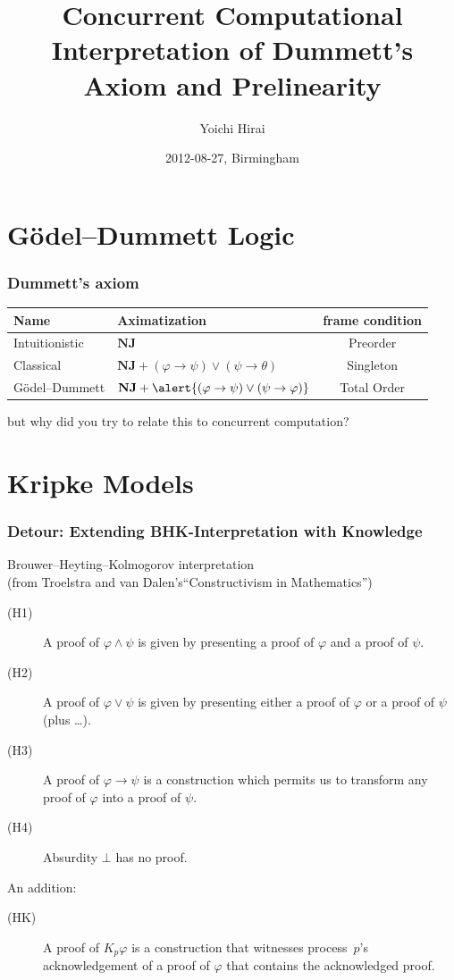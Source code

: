 \documentclass[slidestop,compress,mathserif]{beamer}
\title{Concurrent Computational Interpretation of Dummett's Axiom and Prelinearity}
\author{Yoichi Hirai}
\institute{Univ. of Tokyo, JSPS research fellow, \\
visiting Univ. of Amsterdam (until today)}
\date{2012-08-27, Birmingham}
\renewcommand{\phi}{\varphi}
\begin{document}
 \begin{frame} %
  \titlepage
 \end{frame}


\newcommand{\NJ}{\mathbf{NJ}}

 \section{G\"odel--Dummett Logic}
  \begin{frame}
   \frametitle{Dummett's axiom}
   \begin{tabular}{|l|l|c|}
    \hline
    Name & Aximatization & frame condition\\ \hline\hline
    Intuitionistic & $\NJ$ & Preorder \\ \hline
    Classical & $\NJ + (\phi\rightarrow \psi)\lor(\psi\rightarrow \theta) $
    & Singleton \\ \hline
    {G\"odel--Dummett} & $\NJ + \alert{(\phi\rightarrow \psi)\lor(\psi\rightarrow \phi)}$ &
	    Total Order
	    \\ \hline
   \end{tabular}
   \vfill
   \pause
   but why did you try to relate this to concurrent computation?
   \vfill
  \end{frame}

 \section{Kripke Models}
\frame{\tableofcontents[currentsection]}

  \begin{frame}
   \frametitle{Detour: Extending BHK-Interpretation with Knowledge}

   Brouwer--Heyting--Kolmogorov interpretation\\
   (from Troelstra and van
   Dalen's``Constructivism in Mathematics'')
\begin{description}
 \item[(H1)] A proof of $\varphi\wedge \psi$ is given by presenting a proof of $\varphi$
	    and a proof of $\psi$.
 \item[(H2)] A proof of $\varphi\vee\psi$ is given by presenting either a proof of
	    $\varphi$ or a proof of $\psi$ (plus \ldots).
 \item[(H3)] A proof of $\varphi\rightarrow\psi$ is a construction which permits us to
	    transform any proof of $\varphi$ into a proof of $\psi$.
 \item[(H4)] Absurdity $\bot$ has no proof.
\end{description}
   An addition:
   \begin{description}
 \item[(HK)] A proof of $K_p\varphi$ is a construction that witnesses process~$p$'s
	    acknowledgement of a proof of $\phi$ that contains the acknowledged
	    proof.
   \end{description}

  \end{frame}
\end{document}
